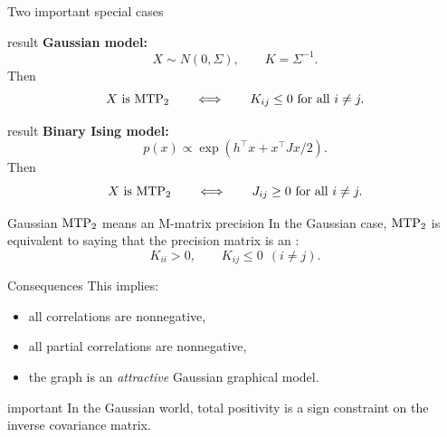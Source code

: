 \documentclass[dvipsnames,aspectratio=169,handout]{beamer}
\begin{document}
\begin{frame}{Two important special cases}
\begin{beamercolorbox}[wd=\textwidth,sep=8pt]{result}
\textbf{Gaussian model:}
\[
X\sim N(0,\Sigma),\qquad K=\Sigma^{-1}.
\]
Then
\[
X \text{ is } {\rm MTP}_{2}
\qquad\Longleftrightarrow\qquad
K_{ij}\leq 0 \text{ for all } i\neq j.
\]
\end{beamercolorbox}

\bigskip

\begin{beamercolorbox}[wd=\textwidth,sep=8pt]{result}
\textbf{Binary Ising model:}
\[
p(x)\propto \exp(h^\top x + x^\top J x/2).
\]
Then
\[
X \text{ is } {\rm MTP}_{2}
\qquad\Longleftrightarrow\qquad
J_{ij}\geq 0 \text{ for all } i\neq j.
\]
\end{beamercolorbox}
\end{frame}

\begin{frame}{Gaussian ${\rm MTP}_{2}$ means an M-matrix precision}
In the Gaussian case, ${\rm MTP}_{2}$ is equivalent to saying that the precision matrix is an :
\[
K_{ii}>0,
\qquad
K_{ij}\leq 0 \ \ (i\neq j).
\]

\begin{block}{Consequences}
This implies:
\begin{itemize}
    \item all correlations are nonnegative,
    \item all partial correlations are nonnegative,
    \item the graph is an \emph{attractive} Gaussian graphical model.
\end{itemize}
\end{block}

\begin{beamercolorbox}[wd=\textwidth,sep=8pt,center,rounded=true,shadow=true]{important}
In the Gaussian world, total positivity is a sign constraint on the inverse covariance matrix.
\end{beamercolorbox}
\end{frame}
\end{document}
